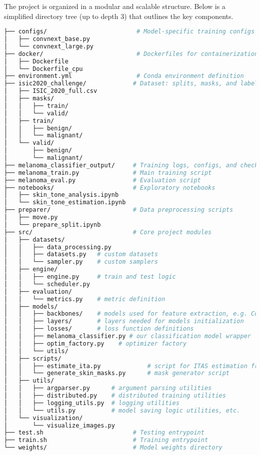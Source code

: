 The project is organized in a modular and scalable structure. Below is a simplified directory tree (up to depth 3) that outlines the key components.

\begin{lstlisting}[language=bash, caption={Project Directory Structure}]
├── configs/                         # Model-specific training configs
│   ├── convnext_base.py
│   └── convnext_large.py
├── docker/                          # Dockerfiles for containerization
│   ├── Dockerfile
│   └── Dockerfile_cpu
├── environment.yml                  # Conda environment definition
├── isic2020_challenge/             # Dataset: splits, masks, and labels
│   ├── ISIC_2020_full.csv
│   ├── masks/
│   │   ├── train/
│   │   └── valid/
│   ├── train/
│   │   ├── benign/
│   │   └── malignant/
│   └── valid/
│       ├── benign/
│       └── malignant/
├── melanoma_classifier_output/     # Training logs, configs, and checkpoints
├── melanoma_train.py               # Main training script
├── melanoma_eval.py                # Evaluation script
├── notebooks/                      # Exploratory notebooks
│   ├── skin_tone_analysis.ipynb
│   └── skin_tone_estimation.ipynb
├── preparer/                       # Data preprocessing scripts
│   ├── move.py
│   └── prepare_split.ipynb
├── src/                            # Core project modules
│   ├── datasets/
│   │   ├── data_processing.py
│   │   ├── datasets.py   # custom datasets
│   │   └── sampler.py    # custom samplers
│   ├── engine/
│   │   ├── engine.py     # train and test logic
│   │   └── scheduler.py  
│   ├── evaluation/ 
│   │   └── metrics.py    # metric definition
│   ├── models/
│   │   ├── backbones/    # models used for feature extraction, e.g. ConvNeXt, DinoV2
│   │   ├── layers/       # layers needed for models initialization
│   │   ├── losses/       # loss function definitions
│   │   ├── melanoma_classifier.py # our classification model wrapper
│   │   ├── optim_factory.py    # optimizer factory
│   │   └── utils/
│   ├── scripts/
│   │   ├── estimate_ita.py             # script for ITAS estimation from images
│   │   └── generate_skin_masks.py      # mask generator script
│   ├── utils/
│   │   ├── argparser.py      # argument parsing utilities
│   │   ├── distributed.py    # distributed training utilities 
│   │   ├── logging_utils.py  # logging utilities
│   │   └── utils.py          # model saving logic utilities, etc.
│   └── visualization/
│       └── visualize_images.py
├── test.sh                         # Testing entrypoint
├── train.sh                        # Training entrypoint
└── weights/                        # Model weights directory
\end{lstlisting}

